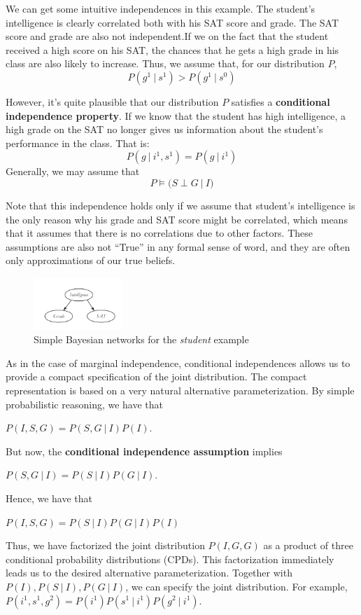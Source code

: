 \documentclass[twoside]{article}
\begin{document}
We can get some intuitive independences in this example. The student's intelligence is clearly correlated both with his SAT score and grade. The SAT score and grade are also not independent.If we on the fact that the student received a high score on his SAT, the chances that he gets a high grade in his class are also likely to increase. Thus, we assume that, for our distribution \(P\),\[P(g^1\ |\ s^1) > P(g^1\ |\ s^0)\]

However, it's quite plausible that our distribution \(P\) satisfies a \textbf{conditional independence property}. If we know that the student has high intelligence, a high grade on the SAT no longer gives us information about the student’s performance in the class. That is:
\[P(g\ |\ i^1,s^1) = P(g\ |\ i^1)\]
Generally, we may assume that \[P\models(S\perp{G\ |\ I)}\]

Note that this independence holds only if we assume that student's intelligence is the only reason why his grade and SAT score might be correlated, which means that it assumes that there is no correlations due to other factors. These assumptions are also not ``True'' in any formal sense of word, and they are often only approximations of our true beliefs.
\begin{figure}
\centering
\includegraphics[width=0.3\textwidth]{assets/student_nb.png}
\caption{\label{fig:student_nb}Simple Bayesian networks for the \emph{student} example}
\end{figure}

As in the case of marginal independence, conditional independences allows us to provide a compact specification of the joint distribution. The compact representation is based on a very natural alternative parameterization. By simple probabilistic reasoning, we have that 

\(P(I,S,G) = P(S,G \ |\ I)P(I).\)

But now, the \textbf{conditional independence assumption} implies 

\(P(S,G\ |\ I) = P(S\ |\ I)P(G\ |\ I).\)

Hence, we have that 

\(P(I,S,G) = P(S\ |\ I)P(G\ |\ I)P(I)\)

Thus, we have factorized the joint distribution \(P(I,G,G)\) as a product of three conditional probability distributions (CPDs). This factorization immediately leads us to the desired alternative parameterization. Together with \(P(I), P(S\ |\ I), P(G\ |\ I)\), we can specify the joint distribution. For example, \(P(i^1,s^1,g^2) = P(i^1)P(s^1\ |\ i^1)P(g^2\ |\ i^1)\).
\end{document}
